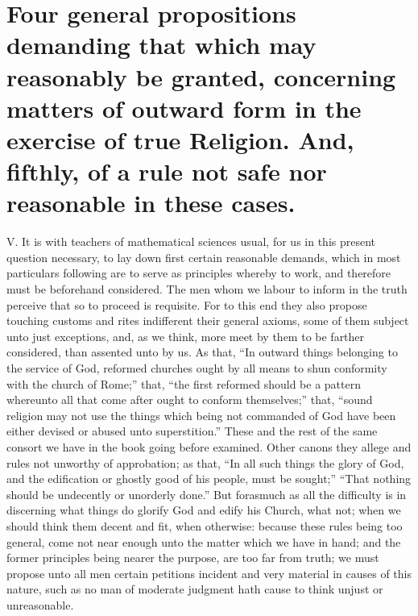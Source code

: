 \section*{Four general propositions demanding that which may reasonably be granted, concerning matters of outward form in the exercise of true Religion. And, fifthly, of a rule not safe nor reasonable in these cases.}
V. It is with teachers of mathematical sciences usual, for us in this present question necessary, to lay down first certain reasonable demands, which in most particulars following are to serve as principles whereby to work, and therefore must be beforehand considered. The men whom we labour to  inform in the truth perceive that so to proceed is requisite. For to this end they also propose touching customs and rites indifferent their general axioms, some of them subject unto just exceptions, and, as we think, more meet by them to be farther considered, than assented unto by us. As that, “In outward things belonging to the service of God, reformed churches ought by all means to shun conformity with the church of Rome;” that, “the first reformed should be a pattern whereunto all that come after ought to conform themselves;” that, “sound religion may not use the things which being not commanded of God have been either devised or abused unto superstition.” These and the rest of the same consort we have in the book going before examined.
Other canons they allege and rules not unworthy of approbation; as that, “In all such things the glory of God, and the edification or ghostly good of his people, must be sought;” “That nothing should be undecently or unorderly done.” But forasmuch as all the difficulty is in discerning what things do glorify God and edify his Church, what not; when we should think them decent and fit, when otherwise: because these rules being too general, come not near enough unto the matter which we have in hand; and the former principles being nearer the purpose, are too far from truth; we must propose unto all men certain petitions incident and very material in causes of this nature, such as no man of moderate judgment hath cause to think unjust or unreasonable.

